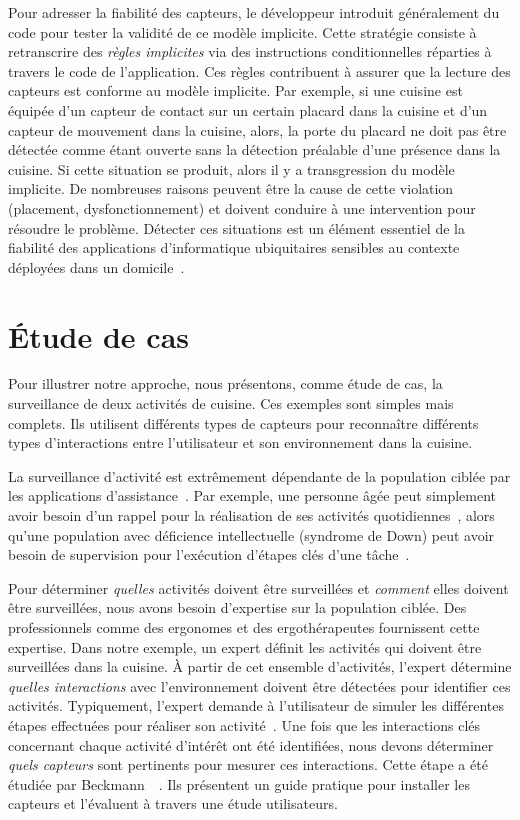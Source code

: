 Pour adresser la fiabilité des capteurs, le développeur 
introduit généralement du code pour tester la validité de ce modèle implicite. Cette 
stratégie consiste à retranscrire des {\em règles implicites} via des 
instructions conditionnelles réparties à travers le code de l'application. 
Ces règles contribuent à assurer que la lecture des capteurs est conforme au 
modèle implicite. Par exemple, si une cuisine est équipée d'un capteur de contact 
sur un certain placard dans la cuisine et d'un capteur de mouvement dans la cuisine, alors, la porte du 
placard ne doit pas être détectée comme étant ouverte sans la détection 
préalable d'une présence dans la cuisine. Si cette situation se produit, 
alors il y a transgression du modèle implicite. De nombreuses raisons peuvent 
être la cause de cette violation (placement, dysfonctionnement) et doivent conduire à 
une intervention pour résoudre le problème. Détecter ces situations est un 
élément essentiel de la fiabilité des applications d'informatique ubiquitaires 
sensibles au contexte déployées dans un domicile~.

\section{Étude de cas}\label{seq:fiabilite:cas}
Pour illustrer notre approche, nous présentons, comme étude de cas, la 
surveillance de deux activités de cuisine. Ces exemples sont simples mais complets. 
Ils utilisent différents types de capteurs pour reconnaître différents types 
d'interactions entre l'utilisateur et son environnement dans la cuisine.

La surveillance d'activité est extrêmement dépendante de la population ciblée 
par les applications d'assistance~. 
Par exemple, une personne âgée peut simplement avoir besoin d'un rappel pour la 
réalisation de ses activités quotidiennes~, 
alors qu'une population avec déficience intellectuelle (\eg syndrome de Down) 
peut avoir besoin de supervision pour l'exécution d'étapes clés d'une tâche~.

Pour déterminer {\em quelles} activités doivent être surveillées et {\em comment} 
elles doivent être surveillées, nous avons besoin d'expertise sur la population 
ciblée. Des professionnels comme des ergonomes et des ergothérapeutes 
fournissent cette expertise. Dans notre exemple, un expert définit les activités 
qui doivent être surveillées dans la cuisine. À partir de cet ensemble d'activités, 
l'expert détermine {\em quelles interactions} avec l'environnement doivent être 
détectées pour identifier ces activités. Typiquement, l'expert demande à 
l'utilisateur de simuler les différentes étapes effectuées pour réaliser son 
activité~. Une fois que les interactions 
clés concernant chaque activité d'intérêt ont été identifiées, nous devons 
déterminer {\em quels capteurs} sont pertinents pour mesurer ces interactions. 
Cette étape a été étudiée par Beckmann~\etal~\parencite{beckmann2004some}. 
Ils présentent un guide pratique pour installer les capteurs et l'évaluent à 
travers une étude utilisateurs.

